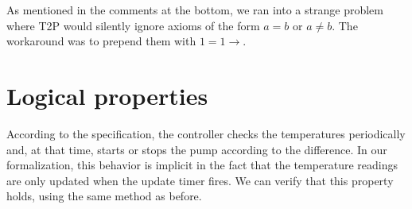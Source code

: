 \documentclass[a4paper,12pt]{article}
\begin{document}
\begin{adjustwidth}{-4em}{-4em}
\end{adjustwidth}

As mentioned in the comments at the bottom, we ran into a strange problem where T2P would silently ignore axioms of the form $a = b$ or $a \neq b$. The workaround was to prepend them with $1=1\rightarrow$.

\section{Logical properties}

According to the specification, the controller checks the temperatures periodically and, at that time, starts or stops the pump according to the difference. In our formalization, this behavior is implicit in the fact that the temperature readings are only updated when the update timer fires.
We can verify that this property holds, using the same method as before.

\begin{adjustwidth}{-4em}{-4em}
\end{adjustwidth}
\end{document}
